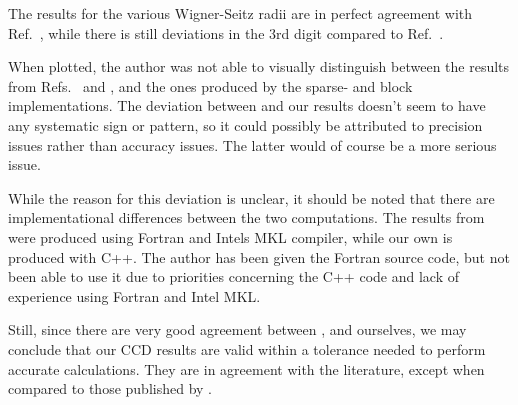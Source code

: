 The results for the various Wigner-Seitz radii are in perfect agreement with Ref.~\cite{Baardsen2014}, while there is still deviations in the 3rd digit compared to Ref.~\cite{Roggero2013}.

When plotted, the author was not able to visually distinguish between the results from Refs.~\cite{Shepherd2012} and \cite{Baardsen2015}, and the ones produced by the sparse- and block implementations. The deviation between \cite{Baardsen2015} and our results doesn't seem to have any systematic sign or pattern, so it could possibly be attributed to precision issues rather than accuracy issues. The latter would of course be a more serious issue.

While the reason for this deviation is unclear, it should be noted that there are implementational differences between the two computations. The results from \cite{Baardsen2015} were produced using Fortran and Intels MKL compiler, while our own is produced with C++. The author has been given the Fortran source code, but not been able to use it due to priorities concerning the C++ code and lack of experience using Fortran and Intel MKL.

Still, since there are very good agreement between \cite{Shepherd2012}, \cite{Baardsen2015} and ourselves, we may conclude that our CCD results are valid within a tolerance needed to perform accurate calculations. They are in agreement with the literature, except when compared to those published by \cite{Roggero2013}.



